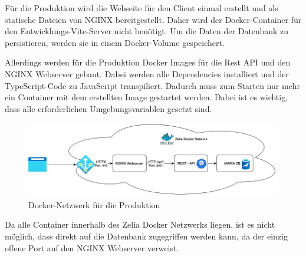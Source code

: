 
Für die Produktion wird die Webseite für den Client einmal erstellt und als statische Dateien von NGINX bereitgestellt. Daher wird der Docker-Container für den Entwicklungs-Vite-Server nicht benötigt. Um die Daten der Datenbank zu persistieren, werden sie in einem Docker-Volume gespeichert. 

Allerdings werden für die Produktion Docker Images für die Rest API und den NGINX Webserver gebaut. Dabei werden alle Dependencies installiert und der TypeScript-Code zu JavaScript transpiliert. Dadurch muss zum Starten nur mehr ein Container mit dem erstellten Image gestartet werden. Dabei ist es wichtig, dass alle erforderlichen Umgebungsvariablen gesetzt sind.

\begin{figure}[H]
    \centering
    \includegraphics{media/Docker/ProdNetwork.png}
    \caption{Docker-Netzwerk für die Produktion}
\end{figure}

Da alle Container innerhalb des Zelia Docker Netzwerks liegen, ist es nicht möglich, dass direkt auf die Datenbank zugegriffen werden kann, da der einzig offene Port auf den NGINX Webserver verweist. 


